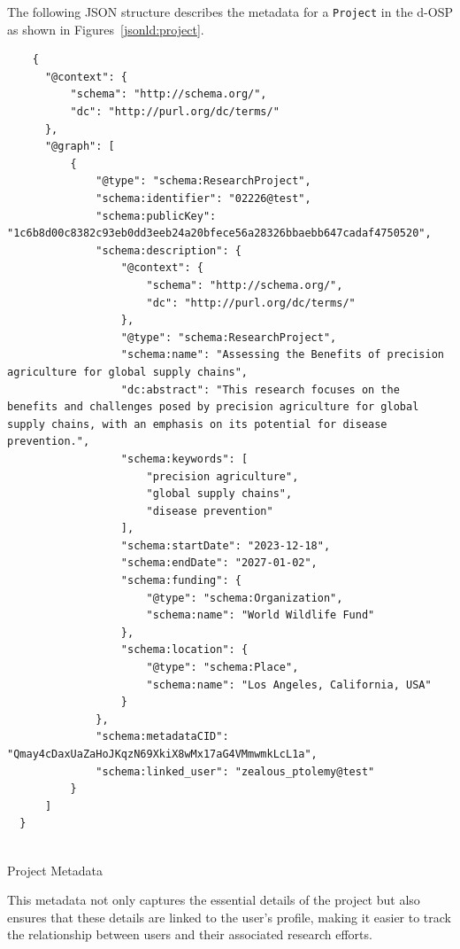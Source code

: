 \documentclass[final]{rc-book-2.14}
\begin{document}
The following JSON structure describes the metadata for a \texttt{Project} in the d-OSP as shown in Figures~\ref{jsonld:project}.


\begin{listing}
    \begin{verbatim}
    {
      "@context": {
          "schema": "http://schema.org/",
          "dc": "http://purl.org/dc/terms/"
      },
      "@graph": [
          {
              "@type": "schema:ResearchProject",
              "schema:identifier": "02226@test",
              "schema:publicKey": "1c6b8d00c8382c93eb0dd3eeb24a20bfece56a28326bbaebb647cadaf4750520",
              "schema:description": {
                  "@context": {
                      "schema": "http://schema.org/",
                      "dc": "http://purl.org/dc/terms/"
                  },
                  "@type": "schema:ResearchProject",
                  "schema:name": "Assessing the Benefits of precision agriculture for global supply chains",
                  "dc:abstract": "This research focuses on the benefits and challenges posed by precision agriculture for global supply chains, with an emphasis on its potential for disease prevention.",
                  "schema:keywords": [
                      "precision agriculture",
                      "global supply chains",
                      "disease prevention"
                  ],
                  "schema:startDate": "2023-12-18",
                  "schema:endDate": "2027-01-02",
                  "schema:funding": {
                      "@type": "schema:Organization",
                      "schema:name": "World Wildlife Fund"
                  },
                  "schema:location": {
                      "@type": "schema:Place",
                      "schema:name": "Los Angeles, California, USA"
                  }
              },
              "schema:metadataCID": "Qmay4cDaxUaZaHoJKqzN69XkiX8wMx17aG4VMmwmkLcL1a",
              "schema:linked_user": "zealous_ptolemy@test"
          }
      ]
  }
  
\end{verbatim}
    \caption{Project Metadata}
    \label{jsonld:project}
\end{listing}



This metadata not only captures the essential details of the project but also ensures that these details are linked to the user's profile, making it easier to track the relationship between users and their associated research efforts.
\end{document}
